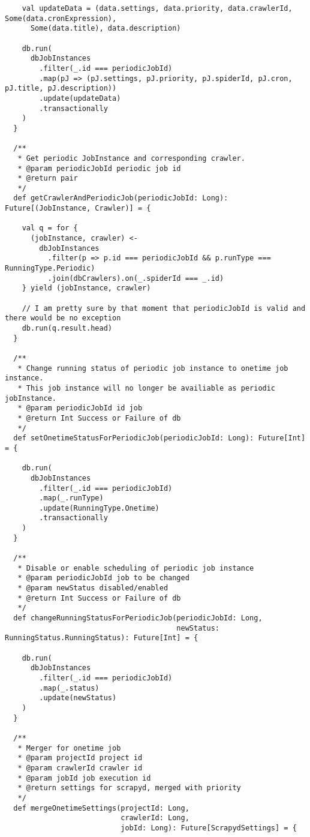 \begin{lstlisting}
    val updateData = (data.settings, data.priority, data.crawlerId, Some(data.cronExpression),
      Some(data.title), data.description)

    db.run(
      dbJobInstances
        .filter(_.id === periodicJobId)
        .map(pJ => (pJ.settings, pJ.priority, pJ.spiderId, pJ.cron, pJ.title, pJ.description))
        .update(updateData)
        .transactionally
    )
  }

  /**
   * Get periodic JobInstance and corresponding crawler.
   * @param periodicJobId periodic job id
   * @return pair
   */
  def getCrawlerAndPeriodicJob(periodicJobId: Long): Future[(JobInstance, Crawler)] = {

    val q = for {
      (jobInstance, crawler) <-
        dbJobInstances
          .filter(p => p.id === periodicJobId && p.runType === RunningType.Periodic)
          .join(dbCrawlers).on(_.spiderId === _.id)
    } yield (jobInstance, crawler)

    // I am pretty sure by that moment that periodicJobId is valid and there would be no exception
    db.run(q.result.head)
  }

  /**
   * Change running status of periodic job instance to onetime job instance.
   * This job instance will no longer be availiable as periodic jobInstance.
   * @param periodicJobId id job
   * @return Int Success or Failure of db
   */
  def setOnetimeStatusForPeriodicJob(periodicJobId: Long): Future[Int] = {

    db.run(
      dbJobInstances
        .filter(_.id === periodicJobId)
        .map(_.runType)
        .update(RunningType.Onetime)
        .transactionally
    )
  }

  /**
   * Disable or enable scheduling of periodic job instance
   * @param periodicJobId job to be changed
   * @param newStatus disabled/enabled
   * @return Int Success or Failure of db
   */
  def changeRunningStatusForPeriodicJob(periodicJobId: Long,
                                        newStatus: RunningStatus.RunningStatus): Future[Int] = {

    db.run(
      dbJobInstances
        .filter(_.id === periodicJobId)
        .map(_.status)
        .update(newStatus)
    )
  }

  /**
   * Merger for onetime job
   * @param projectId project id
   * @param crawlerId crawler id
   * @param jobId job execution id
   * @return settings for scrapyd, merged with priority
   */
  def mergeOnetimeSettings(projectId: Long,
                           crawlerId: Long,
                           jobId: Long): Future[ScrapydSettings] = {


\end{lstlisting}
